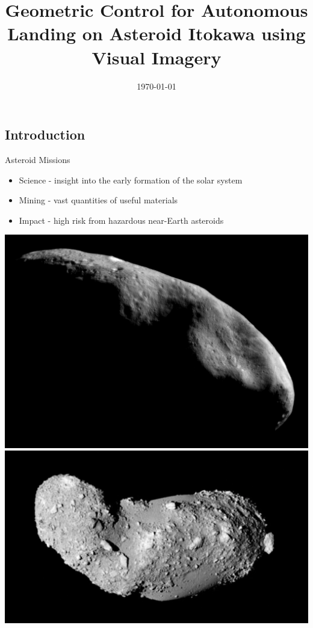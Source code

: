 \documentclass[11pt,professionalfonts]{beamer}
\title[Autonomous Landing]{\large\textbf Geometric Control for Autonomous Landing on Asteroid Itokawa using Visual Imagery  }
\author{\vspace*{-0.3cm}}
\institute{
	\footnotesize
	{\normalsize\bf{Shankar Kulumani, Kuya Takami \\ Taeyoung Lee}}\\
	\vspace*{0.2cm}
  	\textbf{Department of Mechanical \& Aerospace Engineering}\\ \vspace*{0.5cm}
 	\begin{figure} %
       	\texttt{[image: gw\_txh\_2cs\_pos]}
  	\end{figure}
}
\date{\today}
\begin{document}

\setcounter{framenumber}{-1}
\begin{frame} %
  \titlepage
\end{frame}   %

\section*{}
\subsection*{Introduction}  
\begin{frame}{Asteroid Missions}
\begin{itemize}
    \item Science - insight into the early formation of the solar system
    \item Mining - vast quantities of useful materials
    \item Impact - high risk from hazardous near-Earth asteroids
\end{itemize}    

\begin{center}
    \includegraphics[height=0.35\textheight]{figures/near_mos_20001203_full.jpg}
    \hfill
    \includegraphics[height=0.35\textheight]{figures/Itokawa8_hayabusa_1210.jpg}
\end{center}
\end{frame}
\end{document}
